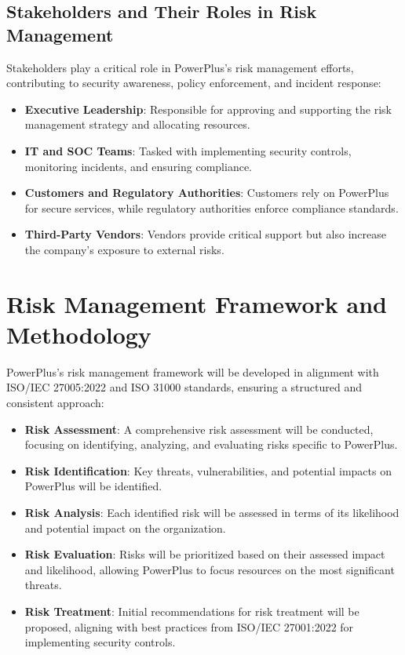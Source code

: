 \subsection{Stakeholders and Their Roles in Risk Management}

Stakeholders play a critical role in PowerPlus’s risk management efforts, contributing to security awareness, policy enforcement, and incident response:
\begin{itemize}
    \item \textbf{Executive Leadership}: Responsible for approving and supporting the risk management strategy and allocating resources.
    \item  \textbf{IT and SOC Teams}: Tasked with implementing security controls, monitoring incidents, and ensuring compliance.
    \item \textbf{Customers and Regulatory Authorities}: Customers rely on PowerPlus for secure services, while regulatory authorities enforce compliance standards.
    \item \textbf{Third-Party Vendors}: Vendors provide critical support but also increase the company’s exposure to external risks.
\end{itemize}
\pagebreak

\section{Risk Management Framework and Methodology}

PowerPlus’s risk management framework will be developed in alignment with ISO/IEC 27005:2022 and ISO 31000 standards, ensuring a structured and consistent approach:
\begin{itemize}
    \item \textbf{Risk Assessment}: A comprehensive risk assessment will be conducted, focusing on identifying, analyzing, and evaluating risks specific to PowerPlus.
    \item \textbf{Risk Identification}: Key threats, vulnerabilities, and potential impacts on PowerPlus will be identified.
    \item \textbf{Risk Analysis}: Each identified risk will be assessed in terms of its likelihood and potential impact on the organization.
    \item \textbf{Risk Evaluation}: Risks will be prioritized based on their assessed impact and likelihood, allowing PowerPlus to focus resources on the most significant threats.
    \item \textbf{Risk Treatment}: Initial recommendations for risk treatment will be proposed, aligning with best practices from ISO/IEC 27001:2022 for implementing security controls.
\end{itemize}

